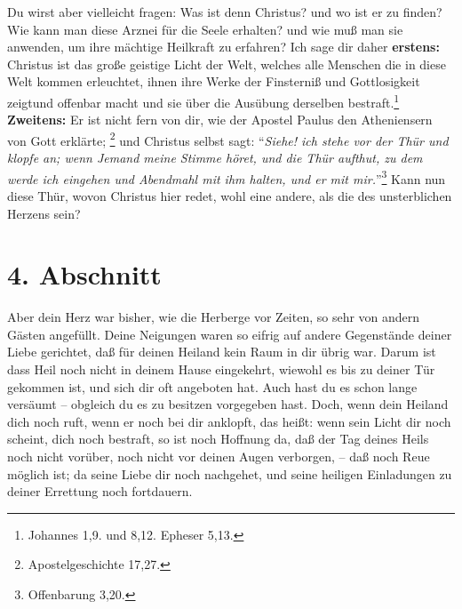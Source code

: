 Du wirst aber vielleicht fragen: Was ist denn Christus? und wo ist er zu finden?
Wie kann man diese Arznei für die Seele erhalten? und wie muß man sie anwenden,
um ihre mächtige Heilkraft zu erfahren? Ich sage dir daher \textbf{erstens:}
Christus ist das große geistige Licht der Welt, welches alle Menschen die in
diese Welt kommen erleuchtet, ihnen ihre Werke der Finsterniß und Gottlosigkeit
zeigtund offenbar macht und sie über die Ausübung derselben bestraft.\footnote{Johannes 1,9. und 8,12. Epheser 5,13.}
 
\textbf{Zweitens:} Er ist nicht fern von dir, wie der
Apostel Paulus den Atheniensern von Gott erklärte;
\footnote{Apostelgeschichte 17,27.} 
und Christus selbst sagt: "`\textit{Siehe! ich stehe vor der Thür und klopfe an;
wenn Jemand meine Stimme höret, und die Thür aufthut, zu dem werde ich eingehen
und Abendmahl mit ihm halten, und er mit mir.}"'\footnote{Offenbarung 3,20.}
Kann 
nun diese Thür, wovon Christus hier redet, wohl eine andere, als die des
unsterblichen Herzens sein?

\section{4. Abschnitt}

Aber dein Herz war bisher, wie die Herberge vor Zeiten, so sehr von andern
Gästen angefüllt. Deine Neigungen waren so eifrig auf andere Gegenstände deiner
Liebe gerichtet, daß für deinen Heiland kein Raum in dir übrig war. Darum ist
dass Heil noch nicht in deinem Hause eingekehrt, wiewohl es bis zu deiner Tür
gekommen ist, und sich dir oft angeboten hat. Auch hast du es schon lange
versäumt -- obgleich du es zu besitzen vorgegeben hast. Doch, wenn dein Heiland
dich noch ruft, wenn er noch bei dir anklopft, das heißt: wenn sein Licht dir
noch scheint, dich noch bestraft, so ist noch Hoffnung da, daß der Tag deines
Heils noch nicht vorüber, noch nicht vor deinen Augen verborgen, -- daß noch Reue
möglich ist; da seine Liebe dir noch nachgehet, und seine heiligen Einladungen
zu deiner Errettung noch fortdauern.

